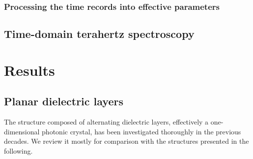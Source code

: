 \documentclass[letterpaper,12pt]{report}
\begin{document}
\subsection{Processing the time records into effective parameters}

\section{Time-domain terahertz spectroscopy}



\chapter{Results}
\section{Planar dielectric layers}
The structure composed of alternating dielectric layers, effectively a one-dimensional photonic crystal, has been investigated thoroughly in the previous decades. We review it mostly for comparison with the structures presented in the following. 
\end{document}
